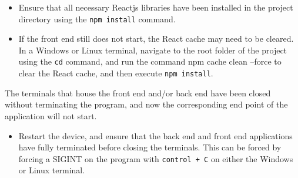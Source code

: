 \documentclass{article}
\begin{document}
\begin{itemize}
    \item Ensure that all necessary Reactjs libraries have been installed in the project directory using the \texttt{npm install} command.
    \item If the front end still does not start, the React cache may need to be cleared. In a Windows or Linux terminal, navigate to the root folder of the project using the \texttt{cd} command, and run the command npm  cache clean --force to clear the React cache, and then execute \texttt{npm install}.
\end{itemize}

The terminals that house the front end and/or back end have been closed without terminating the program, and now the corresponding end point of the application will not start.

\begin{itemize}
    \item Restart the device, and ensure that the back end and front end applications have fully terminated before closing the terminals. This can be forced by forcing a SIGINT on the program with \texttt{control + C} on either the Windows or Linux terminal.
\end{itemize}
\end{document}

